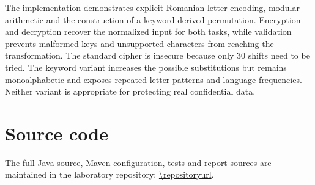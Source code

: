 \documentclass{utmreport}
\begin{document}
\utmconclusions
The implementation demonstrates explicit Romanian letter encoding, modular arithmetic and the construction of a keyword-derived permutation. Encryption and decryption recover the normalized input for both tasks, while validation prevents malformed keys and unsupported characters from reaching the transformation. The standard cipher is insecure because only 30 shifts need to be tried. The keyword variant increases the possible substitutions but remains monoalphabetic and exposes repeated-letter patterns and language frequencies. Neither variant is appropriate for protecting real confidential data.

\chapter*{Source code}
The full Java source, Maven configuration, tests and report sources are maintained in the laboratory repository: \url{\repositoryurl}.
\end{document}
